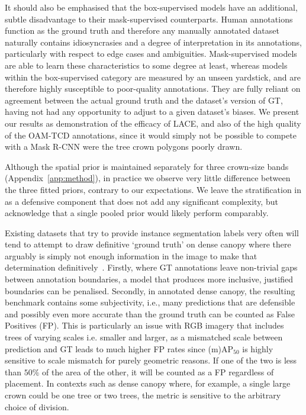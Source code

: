 \documentclass[remotesensing,article,submit,moreauthors]{Definitions/mdpi}
\begin{document}
It should also be emphasised that the box-supervised models have an additional, subtle disadvantage to their mask-supervised counterparts. Human annotations function as the ground truth and therefore any manually annotated dataset naturally contains idiosyncrasies and a degree of interpretation in its annotations, particularly with respect to edge cases and ambiguities. Mask-supervised models are able to learn these characteristics to some degree at least, whereas models within the box-supervised category are measured by an unseen yardstick, and are therefore highly susceptible to poor-quality annotations. They are fully reliant on agreement between the actual ground truth and the dataset's version of GT, having not had any opportunity to adjust to a given dataset's biases. We present our results as demonstration of the efficacy of LACE, and also of the high quality of the OAM-TCD annotations, since it would simply not be possible to compete with a Mask R-CNN were the tree crown polygons poorly drawn. 

Although the spatial prior is maintained separately for three crown-size bands (Appendix~\ref{app:method}), in practice we observe very little difference between the three fitted priors, contrary to our expectations. We leave the stratification in as a defensive component that does not add any significant complexity, but acknowledge that a single pooled prior would likely perform comparably.

Existing datasets that try to provide instance segmentation labels very often will tend to attempt to draw definitive `ground truth' on dense canopy where there arguably is simply not enough information in the image to make that determination definitively~\cite{ball2023,steier2024}. Firstly, where GT annotations leave non-trivial gaps between annotation boundaries, a model that produces more inclusive, justified boundaries can be penalised. Secondly, in annotated dense canopy, the resulting benchmark contains some subjectivity, i.e., many predictions that are defensible and possibly even more accurate than the ground truth can be counted as False Positives (FP). This is particularly an issue with RGB imagery that includes trees of varying scales i.e. smaller and larger, as a mismatched scale between prediction and GT leads to much higher FP rates since (m)AP$_{50}$ is highly sensitive to scale mismatch for purely geometric reasons. If one of the two is less than $50\%$ of the area of the other, it will be counted as a FP regardless of placement. In contexts such as dense canopy where, for example, a single large crown could be one tree or two trees, the metric is sensitive to the arbitrary choice of division.
\end{document}
